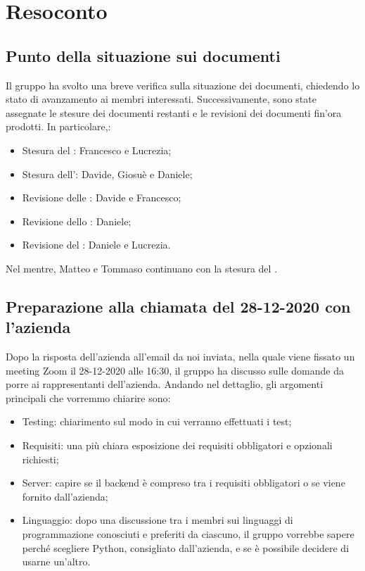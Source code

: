 \section{Resoconto}

\subsection{Punto della situazione sui documenti}

Il gruppo \gruppo{} ha svolto una breve verifica sulla situazione dei documenti, chiedendo lo stato di avanzamento ai membri interessati. Successivamente, sono state assegnate le stesure dei documenti restanti e le revisioni dei documenti fin'ora prodotti. In particolare,:
\begin{itemize}
\item Stesura del \PdQ{}: Francesco e Lucrezia;
\item Stesura dell'\AdR{}: Davide, Giosuè e Daniele;
\item Revisione delle \NdP{}: Davide e Francesco;
\item Revisione dello \SdF{}: Daniele;
\item Revisione del \PdP{}: Daniele e Lucrezia.
\end{itemize}
Nel mentre, Matteo e Tommaso continuano con la stesura del \PdP{}.


\subsection{Preparazione alla chiamata del 28-12-2020 con l'azienda}

Dopo la risposta dell'azienda all'email da noi inviata, nella quale viene fissato un meeting Zoom il 28-12-2020 alle 16:30, il gruppo ha discusso sulle domande da porre ai rappresentanti dell'azienda. Andando nel dettaglio, gli argomenti principali che vorremmo chiarire sono:
\begin{itemize}

\item Testing: chiarimento sul modo in cui verranno effettuati i test;

\item Requisiti: una più chiara esposizione dei requisiti obbligatori e opzionali richiesti;

\item Server: capire se il backend è compreso tra i requisiti obbligatori o se viene fornito dall'azienda;

\item Linguaggio: dopo una discussione tra i membri sui linguaggi di programmazione conosciuti e preferiti da ciascuno, il gruppo vorrebbe sapere perché scegliere Python, consigliato dall'azienda, e se è possibile decidere di usarne un'altro.

\end{itemize}


